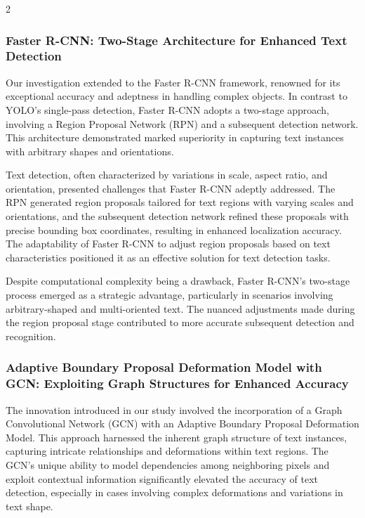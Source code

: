 \documentclass[sn-mathphys,Numbered]{sn-jnl}%
\begin{document}
\begin{multicols}{2}
\subsubsection{Faster R-CNN: Two-Stage Architecture for Enhanced Text Detection}

Our investigation extended to the Faster R-CNN framework, renowned for its exceptional accuracy and adeptness in handling complex objects. In contrast to YOLO's single-pass detection, Faster R-CNN adopts a two-stage approach, involving a Region Proposal Network (RPN) and a subsequent detection network. This architecture demonstrated marked superiority in capturing text instances with arbitrary shapes and orientations.

Text detection, often characterized by variations in scale, aspect ratio, and orientation, presented challenges that Faster R-CNN adeptly addressed. The RPN generated region proposals tailored for text regions with varying scales and orientations, and the subsequent detection network refined these proposals with precise bounding box coordinates, resulting in enhanced localization accuracy. The adaptability of Faster R-CNN to adjust region proposals based on text characteristics positioned it as an effective solution for text detection tasks.

Despite computational complexity being a drawback, Faster R-CNN's two-stage process emerged as a strategic advantage, particularly in scenarios involving arbitrary-shaped and multi-oriented text. The nuanced adjustments made during the region proposal stage contributed to more accurate subsequent detection and recognition.

\subsubsection{Adaptive Boundary Proposal Deformation Model with GCN: Exploiting Graph Structures for Enhanced Accuracy}

The innovation introduced in our study involved the incorporation of a Graph Convolutional Network (GCN) with an Adaptive Boundary Proposal Deformation Model. This approach harnessed the inherent graph structure of text instances, capturing intricate relationships and deformations within text regions. The GCN's unique ability to model dependencies among neighboring pixels and exploit contextual information significantly elevated the accuracy of text detection, especially in cases involving complex deformations and variations in text shape.


\end{multicols}
\end{document}
